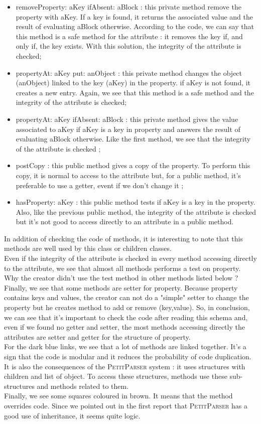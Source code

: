 \begin{itemize}
	\item removeProperty: aKey ifAbsent: aBlock : this private method	remove the property with aKey.  If a key is found, it returns the associated value and the result of evaluating aBlock otherwise.  According to the code, we can say that this method is a safe method for the attribute : it removes the key if, and only if, the key exists.  With this solution, the integrity of the attribute is checked;
	\item propertyAt: aKey put: anObject : this private method changes the object (anObject) linked to the key (aKey) in the property.  if aKey is not found, it creates a new entry.  Again, we see that this method is a safe method and the integrity of the attribute is checked;
	\item propertyAt: aKey ifAbsent: aBlock : this private method gives the value associated to aKey if aKey is a key in property and answers the result of evaluating aBlock otherwise.  Like the first method, we see that the integrity of the attribute is checked ;
	\item postCopy : this public method gives a copy of the property.  To perform this copy, it is normal to access to the attribute but, for a public method, it's preferable to use a getter, event if we don't change it ;
	\item hasProperty: aKey : this public method tests if aKey is a key in the property.  Also, like the previous public method, the integrity of the attribute is checked but it's not good to access directly to an attribute in a public method.
\end{itemize}
In addition of checking the code of methods, it is interesting to note that this methods are well used by this class or children classes.\\
Even if the integrity of the attribute is checked in every method accessing directly to the attribute, we see that almost all methods performs a test on property.  Why the creator didn't use the test method in other methods listed below ? \\
Finally, we see that some methods are setter for property.  Because property contains keys and values, the creator can not do a "simple" setter to change the property but he creates method to add or remove (key,value).  So, in conclusion, we can see that it's important to check the code after reading this schema and, even if we found no getter and setter, the most methods accessing directly the attributes are setter and getter for the structure of property.\\
For the dark blue links, we see that a lot of methods are linked together.  It's a sign that the code is modular and it reduces the probability of code duplication.  It is also the consequences of the \textsc{PetitParser} system : it uses structures with children and list of object.  To access these structures,  methods use these sub-structures and methods related to them.\\
Finally, we see some squares coloured in brown.  It means that the method overrides code. Since we pointed out in the first report that \textsc{PetitParser} has a good use of inheritance, it seems quite logic.

